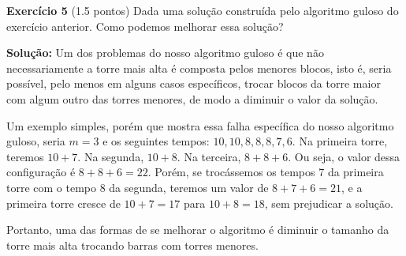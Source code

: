 \noindent \textbf{Exercício 5} (1.5 pontos) Dada uma solução construída pelo algoritmo guloso
do exercício anterior. Como podemos melhorar essa solução?

\bigskip

\noindent \textbf{Solução:}
Um dos problemas do nosso algoritmo guloso é que não necessariamente a torre mais alta é composta pelos menores blocos, isto é, seria possível, pelo menos em alguns casos específicos, trocar blocos da torre maior com algum outro das torres menores, de modo a diminuir o valor da solução.

Um exemplo simples, porém que mostra essa falha específica do nosso algoritmo guloso, seria $m = 3$ e os seguintes tempos: $10, 10, 8, 8, 8, 7, 6$. Na primeira torre, teremos $10+7$. Na segunda, $10+8$. Na terceira, $8+8+6$. Ou seja, o valor dessa configuração é $8+8+6=22$. Porém, se trocássemos os tempos $7$ da primeira torre com o tempo $8$ da segunda, teremos um valor de $8+7+6=21$, e a primeira torre cresce de $10+7=17$ para $10+8=18$, sem prejudicar a solução.

Portanto, uma das formas de se melhorar o algoritmo é diminuir o tamanho da torre mais alta trocando barras com torres menores.
